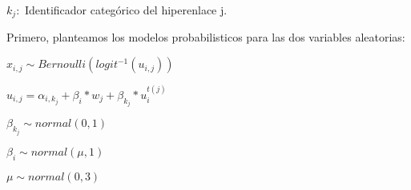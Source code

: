 \begin{center}
    $k_{j}:$ Identificador categórico del hiperenlace j.
\end{center}

Primero, planteamos los modelos probabilisticos para las dos variables aleatorias:

\begin{center} 
    $x_{i,j} \sim Bernoulli(logit^{-1}(u_{i,j}))$
\end{center}

\begin{center} 
    $u_{i,j} = \alpha_{i,k_j} + \beta_{i}*w_{j} + \beta_{k_j}*u_{i}^{t(j)}$
\end{center}

\begin{center}
    $\beta_{k_j} \sim normal(0,1)$
\end{center}

\begin{center}
    $\beta_{i} \sim normal(\mu,1)$
\end{center}

\begin{center}
    $\mu \sim normal(0,3)$
\end{center}